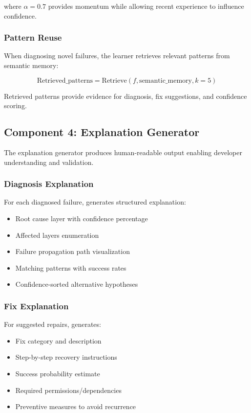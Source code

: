 \documentclass[11pt]{article}
\begin{document}
where $\alpha=0.7$ provides momentum while allowing recent experience to influence confidence.

\subsubsection{Pattern Reuse}

When diagnosing novel failures, the learner retrieves relevant patterns from semantic memory:

\begin{equation}
\text{Retrieved\_patterns} = \text{Retrieve}(f, \text{semantic\_memory}, k=5)
\end{equation}

Retrieved patterns provide evidence for diagnosis, fix suggestions, and confidence scoring.

\subsection{Component 4: Explanation Generator}

The explanation generator produces human-readable output enabling developer understanding and validation.

\subsubsection{Diagnosis Explanation}

For each diagnosed failure, generates structured explanation:

\begin{itemize}
    \item Root cause layer with confidence percentage
    \item Affected layers enumeration
    \item Failure propagation path visualization
    \item Matching patterns with success rates
    \item Confidence-sorted alternative hypotheses
\end{itemize}

\subsubsection{Fix Explanation}

For suggested repairs, generates:
\begin{itemize}
    \item Fix category and description
    \item Step-by-step recovery instructions
    \item Success probability estimate
    \item Required permissions/dependencies
    \item Preventive measures to avoid recurrence
\end{itemize}
\end{document}
